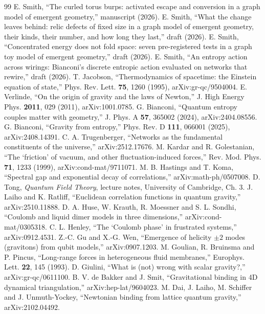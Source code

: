 \documentclass[pre,twocolumn,superscriptaddress,nofootinbib]{revtex4-2}
\begin{document}
\begin{thebibliography}{99}
 E. Smith, ``The curled torus burps: activated escape and conversion in a graph model of emergent
geometry,'' manuscript (2026).
 E. Smith, ``What the change leaves behind: relic defects of fixed size in a graph model of emergent
geometry, their kinds, their number, and how long they last,'' draft (2026).
 E. Smith, ``Concentrated energy does not fold space: seven pre-registered tests in a graph toy model of
emergent geometry,'' draft (2026).
 E. Smith, ``An entropy action across wirings: Bianconi's discrete entropic action evaluated on
networks that rewire,'' draft (2026).
 T. Jacobson, ``Thermodynamics of spacetime: the Einstein equation of state,'' Phys. Rev. Lett.
\textbf{75}, 1260 (1995), arXiv:gr-qc/9504004.
 E. Verlinde, ``On the origin of gravity and the laws of Newton,'' J. High Energy Phys.
\textbf{2011}, 029 (2011), arXiv:1001.0785.
 G. Bianconi, ``Quantum entropy couples matter with geometry,'' J. Phys. A \textbf{57}, 365002 (2024),
arXiv:2404.08556.
 G. Bianconi, ``Gravity from entropy,'' Phys. Rev. D \textbf{111}, 066001 (2025), arXiv:2408.14391.
 C. A. Trugenberger, ``Networks as the fundamental constituents of the universe,'' arXiv:2512.17676.
 M. Kardar and R. Golestanian, ``The `friction' of vacuum, and other fluctuation-induced forces,'' Rev. Mod.
Phys. \textbf{71}, 1233 (1999), arXiv:cond-mat/9711071.
 M. B. Hastings and T. Koma, ``Spectral gap and exponential decay of correlations,'' arXiv:math-ph/0507008.
 D. Tong, \emph{Quantum Field Theory}, lecture notes, University of Cambridge, Ch. 3.
 J. Laiho and K. Ratliff, ``Euclidean correlation functions in quantum gravity,'' arXiv:2510.11888.
 D. A. Huse, W. Krauth, R. Moessner and S. L. Sondhi, ``Coulomb and liquid dimer models in three
dimensions,'' arXiv:cond-mat/0305318.
 C. L. Henley, ``The `Coulomb phase' in frustrated systems,'' arXiv:0912.4531.
 Z.-C. Gu and X.-G. Wen, ``Emergence of helicity $\pm 2$ modes (gravitons) from qubit models,''
arXiv:0907.1203.
 M. Goulian, R. Bruinsma and P. Pincus, ``Long-range forces in heterogeneous fluid membranes,'' Europhys.
Lett. \textbf{22}, 145 (1993).
 D. Giulini, ``What is (not) wrong with scalar gravity?,'' arXiv:gr-qc/0611100.
 B. V. de Bakker and J. Smit, ``Gravitational binding in 4D dynamical triangulation,''
arXiv:hep-lat/9604023.
 M. Dai, J. Laiho, M. Schiffer and J. Unmuth-Yockey, ``Newtonian binding from lattice quantum gravity,''
arXiv:2102.04492.
\end{thebibliography}
\end{document}
